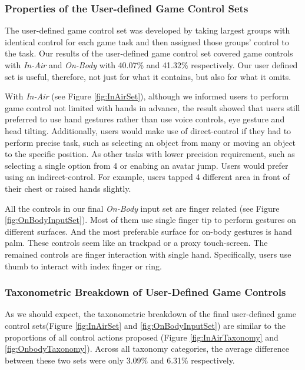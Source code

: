 \documentclass{sigchi}
\begin{document}
   \subsubsection{Properties of the User-defined Game Control Sets}
   The user-defined game control set was developed by taking largest groups with identical control for each game task and then assigned those groups' control to the task. 
   Our results of the user-defined game control set covered game controls with \emph{In-Air} and \emph{On-Body} with 40.07\% and 41.32\% respectively. Our user defined set is useful, therefore, not just for what it contains, but also for what it omits.

   With \emph{In-Air} (see Figure \ref{fig:InAirSet}), although we informed users to perform game control not limited with hands in advance, the result showed that users still preferred to use hand gestures rather than use voice controls, eye gesture and head tilting. Additionally, users would make use of direct-control if they had to perform precise task, such as selecting an object from many or moving an object to the specific position. As other tasks with lower precision requirement, such as selecting a single option from 4 or enabing an avatar jump. Users would prefer using an indirect-control. For example, users tapped 4 different area in front of their chest or raised hands slightly.


    All the controls in our final \emph{On-Body} input set are finger related (see Figure \ref{fig:OnBodyInputSet}). Most of them use single finger tip to perform gestures on different surfaces. And the most preferable surface for on-body gestures is hand palm. These controls seem like an trackpad or a proxy touch-screen. The remained controls are finger interaction with single hand. Specifically, users use thumb to interact with index finger or ring.

   \subsubsection{Taxonometric Breakdown of User-Defined Game Controls}
   As we should expect, the taxonometric breakdown of the final user-defined game control sets(Figure \ref{fig:InAirSet} and \ref{fig:OnBodyInputSet}) are similar to the proportions of all control actions proposed (Figure \ref{fig:InAirTaxonomy} and \ref{fig:OnbodyTaxonomy}). Across all taxonomy categories, the average difference between these two sets were only 3.09\% and 6.31\% respectively.
\end{document}
